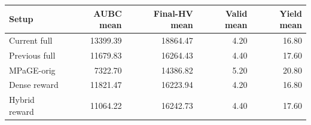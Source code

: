 \begin{tabular}{lrrrr}
\toprule
Setup & AUBC mean & Final-HV mean & Valid mean & Yield mean \\
\midrule
Current full & 13399.39 & 18864.47 & 4.20 & 16.80 \\
Previous full & 11679.83 & 16264.43 & 4.40 & 17.60 \\
MPaGE-orig & 7322.70 & 14386.82 & 5.20 & 20.80 \\
Dense reward & 11821.47 & 16223.94 & 4.20 & 16.80 \\
Hybrid reward & 11064.22 & 16242.73 & 4.40 & 17.60 \\
\bottomrule
\end{tabular}
